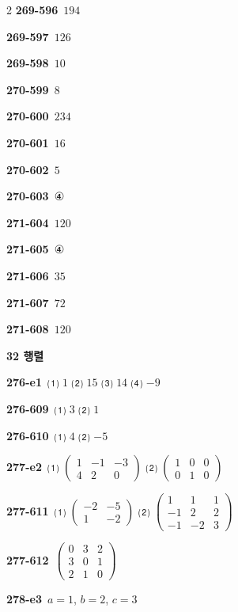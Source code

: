\documentclass[10pt,a4paper]{article}
\begin{document}
\begin{multicols}{2}
\noindent\textbf{269-596}\ $194$\par
\noindent\textbf{269-597}\ $126$\par
\noindent\textbf{269-598}\ $10$\par
\noindent\textbf{270-599}\ $8$\par
\noindent\textbf{270-600}\ $234$\par
\noindent\textbf{270-601}\ $16$\par
\noindent\textbf{270-602}\ $5$\par
\noindent\textbf{270-603}\ ④\par
\noindent\textbf{271-604}\ $120$\par
\noindent\textbf{271-605}\ ④\par
\noindent\textbf{271-606}\ $35$\par
\noindent\textbf{271-607}\ $72$\par
\noindent\textbf{271-608}\ $120$\par
\noindent\textbf{32 행렬}\par\smallskip
\noindent\textbf{276-e1}\ ⑴ $1$ ⑵ $15$ ⑶ $14$ ⑷ $-9$\par
\noindent\textbf{276-609}\ ⑴ $3$ ⑵ $1$\par
\noindent\textbf{276-610}\ ⑴ $4$ ⑵ $-5$\par
\noindent\textbf{277-e2}\ ⑴ $\begin{pmatrix} 1 & -1 & -3 \\ 4 & 2 & 0 \end{pmatrix}$ ⑵ $\begin{pmatrix} 1 & 0 & 0 \\ 0 & 1 & 0 \end{pmatrix}$\par
\noindent\textbf{277-611}\ ⑴ $\begin{pmatrix} -2 & -5 \\ 1 & -2 \end{pmatrix}$ ⑵ $\begin{pmatrix} 1 & 1 & 1 \\ -1 & 2 & 2 \\ -1 & -2 & 3 \end{pmatrix}$\par
\noindent\textbf{277-612}\ $\begin{pmatrix} 0 & 3 & 2 \\ 3 & 0 & 1 \\ 2 & 1 & 0 \end{pmatrix}$\par
\noindent\textbf{278-e3}\ $a=1$, $b=2$, $c=3$\par

\end{multicols}
\end{document}
